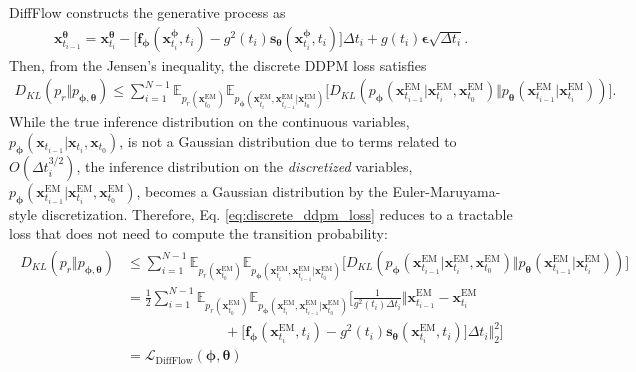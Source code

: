 \documentclass{article}
\theoremstyle{definition}
\theoremstyle{remark}
\begin{document}
	DiffFlow constructs the generative process as
	\begin{align*}
	\mathbf{x}_{t_{i-1}}^{\bm{\theta}}=\mathbf{x}_{t_{i}}^{\bm{\theta}}-\big[\mathbf{f}_{\bm{\phi}}(\mathbf{x}_{t_{i}}^{\bm{\phi}},t_{i})-g^{2}(t_{i})\mathbf{s}_{\bm{\theta}}(\mathbf{x}_{t_{i}}^{\bm{\phi}},t_{i})\big]\Delta t_{i}+g(t_{i})\bm{\epsilon}\sqrt{\Delta t_{i}}.
	\end{align*}
	Then, from the Jensen's inequality, the discrete DDPM loss satisfies
	\begin{align}\label{eq:discrete_ddpm_loss}
	D_{KL}(p_{r}\Vert p_{\bm{\phi},\bm{\theta}})\le\sum_{i=1}^{N-1}\mathbb{E}_{p_{r}(\mathbf{x}_{t_{0}}^{\text{EM}})}\mathbb{E}_{p_{\bm{\phi}}(\mathbf{x}_{t_{i}}^{\text{EM}},\mathbf{x}_{t_{i-1}}^{\text{EM}}\vert\mathbf{x}_{t_{0}}^{\text{EM}})}\big[D_{KL}(p_{\bm{\phi}}(\mathbf{x}_{t_{i-1}}^{\text{EM}}\vert\mathbf{x}_{t_{i}}^{\text{EM}},\mathbf{x}_{t_{0}}^{\text{EM}})\Vert p_{\bm{\theta}}(\mathbf{x}_{t_{i-1}}^{\text{EM}}\vert\mathbf{x}_{t_{i}}^{\text{EM}}))\big].
	\end{align}
	While the true inference distribution on the continuous variables, $p_{\bm{\phi}}(\mathbf{x}_{t_{i-1}}\vert\mathbf{x}_{t_{i}},\mathbf{x}_{t_{0}})$, is not a Gaussian distribution due to terms related to $O(\Delta t_{i}^{3/2})$, the inference distribution on the \textit{discretized} variables, $p_{\bm{\phi}}(\mathbf{x}_{t_{i-1}}^{\text{EM}}\vert\mathbf{x}_{t_{i}}^{\text{EM}},\mathbf{x}_{t_{0}}^{\text{EM}})$, becomes a Gaussian distribution by the Euler-Maruyama-style discretization. Therefore, Eq. \eqref{eq:discrete_ddpm_loss} reduces to a tractable loss that does not need to compute the transition probability:
	\begin{align}\label{eq:ddpm_style_loss}
	\begin{split}
	D_{KL}(p_{r}\Vert p_{\bm{\phi},\bm{\theta}})&\le\sum_{i=1}^{N-1}\mathbb{E}_{p_{r}(\mathbf{x}_{t_{0}}^{\text{EM}})}\mathbb{E}_{p_{\bm{\phi}}(\mathbf{x}_{t_{i}}^{\text{EM}},\mathbf{x}_{t_{i-1}}^{\text{EM}}\vert\mathbf{x}_{t_{0}}^{\text{EM}})}\big[D_{KL}(p_{\bm{\phi}}(\mathbf{x}_{t_{i-1}}^{\text{EM}}\vert\mathbf{x}_{t_{i}}^{\text{EM}},\mathbf{x}_{t_{0}}^{\text{EM}})\Vert p_{\bm{\theta}}(\mathbf{x}_{t_{i-1}}^{\text{EM}}\vert\mathbf{x}_{t_{i}}^{\text{EM}}))\big]\\
	&=\frac{1}{2}\sum_{i=1}^{N-1}\mathbb{E}_{p_{r}(\mathbf{x}_{t_{0}}^{\text{EM}})}\mathbb{E}_{p_{\bm{\phi}}(\mathbf{x}_{t_{i}}^{\text{EM}},\mathbf{x}_{t_{i-1}}^{\text{EM}}\vert\mathbf{x}_{t_{0}}^{\text{EM}})}\bigg[\frac{1}{g^{2}(t_{i})\Delta t_{i}}\Big\Vert\mathbf{x}_{t_{i-1}}^{\text{EM}}-\mathbf{x}_{t_{i}}^{\text{EM}}\\
	&\quad\quad\quad\quad\quad\quad\quad+\big[\mathbf{f}_{\bm{\phi}}(\mathbf{x}_{t_{i}}^{\text{EM}},t_{i})-g^{2}(t_{i})\mathbf{s}_{\bm{\theta}}(\mathbf{x}_{t_{i}}^{\text{EM}},t_{i})\big]\Delta t_{i}\Big\Vert_{2}^{2}\bigg]\\
	&=\mathcal{L}_{\text{DiffFlow}}(\bm{\phi},\bm{\theta})
	\end{split}
	\end{align}
\end{document}
